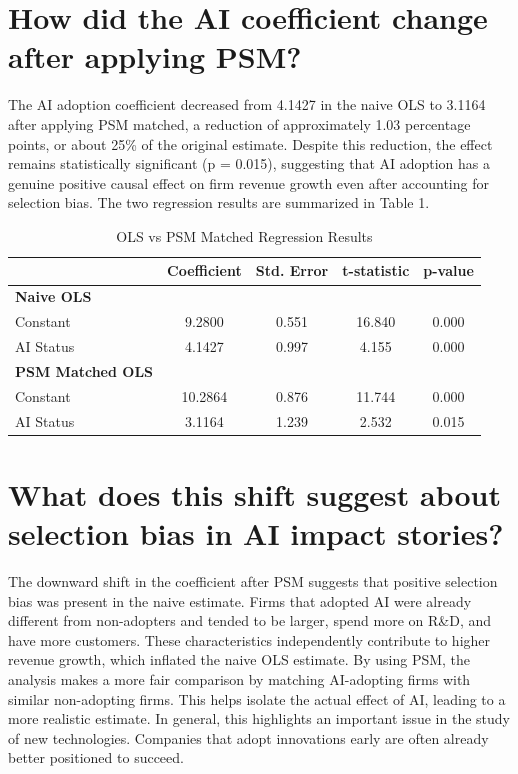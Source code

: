 \documentclass[12pt]{article}
\title{Assignment #1}
\author{}
\date{}
\begin{document}
\maketitle

\section{How did the AI coefficient change after applying PSM?}

The AI adoption coefficient decreased from 4.1427 in the naive OLS to 3.1164 after applying PSM matched, a reduction of approximately 1.03 percentage points, or about 25\% of the original estimate. Despite this reduction, the effect remains statistically significant (p = 0.015), suggesting that AI adoption has a genuine positive causal effect on firm revenue growth even after accounting for selection bias. The two regression results are summarized in Table 1.

\begin{table}[h!]
\centering
\caption{OLS vs PSM Matched Regression Results}
\begin{tabular}{lcccc}
\toprule
 & Coefficient & Std. Error & t-statistic & p-value \\
\midrule
\textbf{Naive OLS} & & & & \\
Constant  & 9.2800  & 0.551 & 16.840 & 0.000 \\
AI Status & 4.1427  & 0.997 & 4.155  & 0.000 \\
\midrule
\textbf{PSM Matched OLS} & & & & \\
Constant  & 10.2864 & 0.876 & 11.744 & 0.000 \\
AI Status & 3.1164  & 1.239 & 2.532  & 0.015 \\
\bottomrule
\end{tabular}
\end{table}

\section{What does this shift suggest about selection bias in AI impact stories?}

The downward shift in the coefficient after PSM suggests that positive selection bias was present in the naive estimate. Firms that adopted AI were already different from non-adopters and tended to be larger, spend more on R\&D, and have more customers. These characteristics independently contribute to higher revenue growth, which inflated the naive OLS estimate. By using PSM, the analysis makes a more fair comparison by matching AI-adopting firms with similar non-adopting firms. This helps isolate the actual effect of AI, leading to a more realistic estimate. In general, this highlights an important issue in the study of new technologies. Companies that adopt innovations early are often already better positioned to succeed. 
\end{document}
